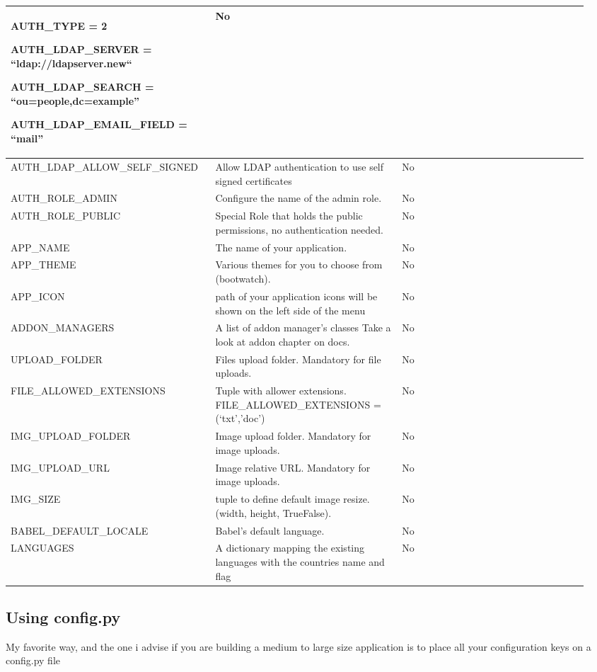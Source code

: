\documentclass[letterpaper,10pt,english]{sphinxmanual}
\begin{document}
\begin{tabular}{|p{0.317\linewidth}|p{0.317\linewidth}|p{0.317\linewidth}|}
AUTH\_TYPE = 2

AUTH\_LDAP\_SERVER = ``ldap://ldapserver.new``

AUTH\_LDAP\_SEARCH = ``ou=people,dc=example''

AUTH\_LDAP\_EMAIL\_FIELD = ``mail''
 & 
No
\\
\hline
AUTH\_LDAP\_ALLOW\_SELF\_SIGNED
 & 
Allow LDAP authentication to use self
signed certificates
 & 
No
\\
\hline
AUTH\_ROLE\_ADMIN
 & 
Configure the name of the admin role.
 & 
No
\\
\hline
AUTH\_ROLE\_PUBLIC
 & 
Special Role that holds the public
permissions, no authentication needed.
 & 
No
\\
\hline
APP\_NAME
 & 
The name of your application.
 & 
No
\\
\hline
APP\_THEME
 & 
Various themes for you to choose
from (bootwatch).
 & 
No
\\
\hline
APP\_ICON
 & 
path of your application icons
will be shown on the left side of the menu
 & 
No
\\
\hline
ADDON\_MANAGERS
 & 
A list of addon manager's classes
Take a look at addon chapter on docs.
 & 
No
\\
\hline
UPLOAD\_FOLDER
 & 
Files upload folder.
Mandatory for file uploads.
 & 
No
\\
\hline
FILE\_ALLOWED\_EXTENSIONS
 & 
Tuple with allower extensions.
FILE\_ALLOWED\_EXTENSIONS = (`txt','doc')
 & 
No
\\
\hline
IMG\_UPLOAD\_FOLDER
 & 
Image upload folder.
Mandatory for image uploads.
 & 
No
\\
\hline
IMG\_UPLOAD\_URL
 & 
Image relative URL.
Mandatory for image uploads.
 & 
No
\\
\hline
IMG\_SIZE
 & 
tuple to define default image resize.
(width, height, True\textbar{}False).
 & 
No
\\
\hline
BABEL\_DEFAULT\_LOCALE
 & 
Babel's default language.
 & 
No
\\
\hline
LANGUAGES
 & 
A dictionary mapping
the existing languages with the countries
name and flag
 & 
No
\\
\hline\end{tabular}



\subsection{Using config.py}
\label{config:using-config-py}
My favorite way, and the one i advise if you are building a medium to large size application
is to place all your configuration keys on a config.py file
\end{document}
